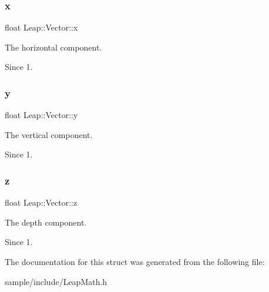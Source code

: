\subsubsection{\texorpdfstring{x}{x}}
{\footnotesize\ttfamily float Leap\+::\+Vector\+::x}

The horizontal component. \begin{DoxySince}{Since}
1. 
\end{DoxySince}
\mbox{\label{struct_leap_1_1_vector_abfff2f5b5c10d58a43cf377fc4cb9951}} 
\subsubsection{\texorpdfstring{y}{y}}
{\footnotesize\ttfamily float Leap\+::\+Vector\+::y}

The vertical component. \begin{DoxySince}{Since}
1. 
\end{DoxySince}
\mbox{\label{struct_leap_1_1_vector_aa44971ce01ce035e78ea557bc1e983a4}} 
\subsubsection{\texorpdfstring{z}{z}}
{\footnotesize\ttfamily float Leap\+::\+Vector\+::z}

The depth component. \begin{DoxySince}{Since}
1. 
\end{DoxySince}


The documentation for this struct was generated from the following file\+:\begin{DoxyCompactItemize}
\item 
sample/include/Leap\+Math.\+h\end{DoxyCompactItemize}

